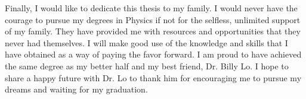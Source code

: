 Finally, I would like to dedicate this thesis to my family.
I would never have the courage to pursue my degrees in Physics if not for the
selfless, unlimited support of my family.  
They have provided me with resources and opportunities that they never had
themselves. 
I will make good use of the knowledge and skills that I have obtained as a way
of paying the favor forward. I am proud to have achieved the same degree as my 
better half and my best friend, Dr. Billy Lo. I hope to share a happy future
with Dr. Lo to thank him for encouraging me to pursue my dreams and waiting for
my graduation. 
